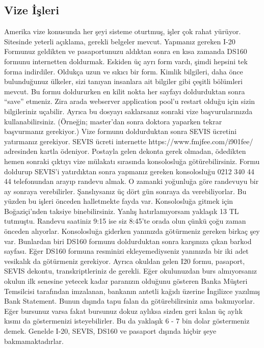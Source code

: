 \documentclass[12pt]{article}
\begin{document}
\subsection{Vize İşleri}
Amerika vize konusunda her şeyi sisteme oturtmuş, işler çok rahat yürüyor. Sitesinde yeterli açıklama, gerekli belgeler mevcut. Yapmanız gereken I-20 Formunuz geldikten ve pasaportunuzu aldıktan sonra en kısa zamanda DS160 formunu internetten doldurmak. Eskiden üç ayrı form vardı, şimdi hepsini tek forma indirdiler. Oldukça uzun ve sıkıcı bir form. Kimlik bilgileri, daha önce bulunduğunuz ülkeler, sizi tanıyan insanlara ait bilgiler gibi çeşitli bölümleri mevcut. Bu formu doldururken en kilit nokta her sayfayı doldurduktan sonra “save” etmeniz. Zira arada webserver application pool’u restart olduğu için sizin bilgileriniz uçabilir. Ayrıca bu dosyayı saklarsanız sonraki vize başvurularınızda kullanabilirsiniz. (Örneğin; master’dan sonra doktora yaparken tekrar başvurmanız gerekiyor.) Vize formunu doldurduktan sonra SEVIS ücretini yatırmanız gerekiyor. SEVIS ücreti internette https://www.fmjfee.com/i901fee/ adresinden kartla ödeniyor. Postayla gelen dekonta gerek olmadan, ödedikten hemen sonraki çıktıyı vize mülakatı sırasında konsolosluğa götürebilirsiniz. Formu doldurup SEVIS’i yatırdıktan sonra yapmanız gereken konsolosluğu 0212 340 44 44 telefonundan arayıp randevu almak. O zamanki yoğunluğa göre randevuyu bir ay sonraya verebilirler. Şanslıysanız üç dört gün sonraya da verebiliyorlar. Bu yüzden bu işleri önceden halletmekte fayda var. Konsolosluğa gitmek için Boğaziçi’nden taksiye binebilirsiniz. Yanlış hatırlamıyorsam yaklaşık 13 TL tutmuştu. Randevu saatiniz 9:15 ise siz 8:45’te orada olun çünkü çoğu zaman önceden alıyorlar. Konsolosluğa giderken yanınızda götürmeniz gereken birkaç şey var. Bunlardan biri DS160 formunu doldurduktan sonra karşınıza çıkan barkod sayfası. Eğer DS160 formuna resminizi ekleyemediyseniz yanınızda bir iki adet vesikalık da götürmeniz gerekiyor. Ayrıca okuldan gelen I20 formu, pasaport, SEVIS dekontu, transkriptleriniz de gerekli. Eğer okulunuzdan burs almıyorsanız okulun ilk senesine yetecek kadar paranızın olduğunu gösteren Banka Müşteri Temsilcisi tarafından imzalanan, bankanın antetli kağıdı üzerine İngilizce yazılmış Bank Statement. Bunun dışında tapu falan da götürebilirsiniz ama bakmıyorlar. Eğer bursunuz varsa fakat bursunuz dokuz aylıksa sizden geri kalan üç aylık kısmı da göstermenizi isteyebilirler. Bu da yaklaşık 6 - 7 bin dolar göstermeniz demek. Genelde I-20, SEVIS, DS160 ve pasaport dışında hiçbir şeye bakmamaktadırlar.
%
%
%
\end{document}
